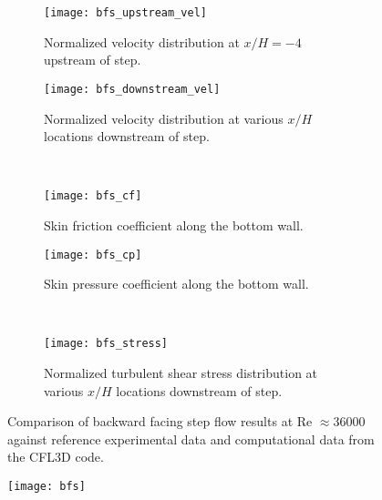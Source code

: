 \begin{figure}[htb]
  \centering
  \hfill
  \begin{subfigure}[b]{0.4\columnwidth}
    \centering
    \texttt{[image: bfs\_upstream\_vel]}
    \caption{Normalized velocity distribution at $x/H=-4$ upstream of step.}
    \label{fig:}
  \end{subfigure}
  \hfill
  \begin{subfigure}[b]{0.4\columnwidth}
    \centering
    \texttt{[image: bfs\_downstream\_vel]}
    \caption{Normalized velocity distribution at various $x/H$ locations downstream of step.}
    \label{fig:}
  \end{subfigure} \hfill \\
  \centering
  \hfill
  \begin{subfigure}[b]{0.4\columnwidth}
    \centering
    \texttt{[image: bfs\_cf]}
    \caption{Skin friction coefficient along the bottom wall.}
    \label{fig:}
  \end{subfigure}
  \hfill
  \begin{subfigure}[b]{0.4\columnwidth}
    \centering
    \texttt{[image: bfs\_cp]}
    \caption{Skin pressure coefficient along the bottom wall.}
    \label{fig:}
  \end{subfigure} \hfill \\
  \centering
  \begin{subfigure}[b]{0.4\columnwidth}
    \centering
    \texttt{[image: bfs\_stress]}
    \caption{Normalized turbulent shear stress distribution at various $x/H$ locations downstream
    of step.}
    \label{fig:}
  \end{subfigure}
  \caption{Comparison of backward facing step flow results at Re $\approx 36000$ against reference
  experimental data and computational data from the CFL3D code.}
  \label{fig:}
\end{figure}

\begin{figure}[htb!]
  \centering
  \texttt{[image: bfs]}
  \caption{}
  \label{fig:}
\end{figure}

